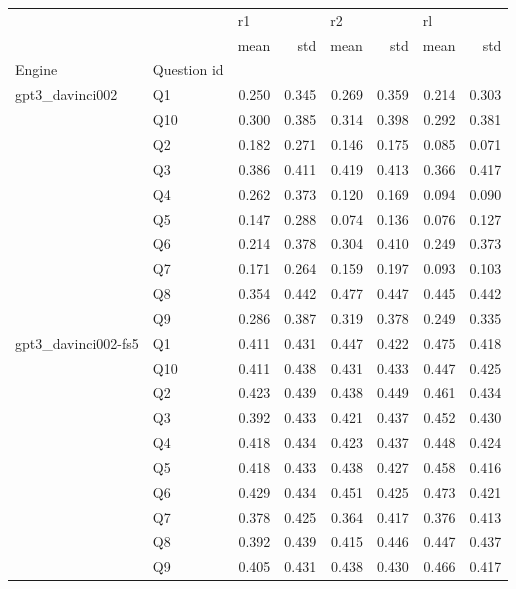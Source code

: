 \begin{tabular}{llrrrrrr}
\toprule
                &   & \multicolumn{2}{l}{r1} & \multicolumn{2}{l}{r2} & \multicolumn{2}{l}{rl} \\
                &   &  mean &   std &  mean &   std &  mean &   std \\
Engine & Question id &       &       &       &       &       &       \\
\midrule
gpt3\_davinci002 & Q1 & 0.250 & 0.345 & 0.269 & 0.359 & 0.214 & 0.303 \\
                & Q10 & 0.300 & 0.385 & 0.314 & 0.398 & 0.292 & 0.381 \\
                & Q2 & 0.182 & 0.271 & 0.146 & 0.175 & 0.085 & 0.071 \\
                & Q3 & 0.386 & 0.411 & 0.419 & 0.413 & 0.366 & 0.417 \\
                & Q4 & 0.262 & 0.373 & 0.120 & 0.169 & 0.094 & 0.090 \\
                & Q5 & 0.147 & 0.288 & 0.074 & 0.136 & 0.076 & 0.127 \\
                & Q6 & 0.214 & 0.378 & 0.304 & 0.410 & 0.249 & 0.373 \\
                & Q7 & 0.171 & 0.264 & 0.159 & 0.197 & 0.093 & 0.103 \\
                & Q8 & 0.354 & 0.442 & 0.477 & 0.447 & 0.445 & 0.442 \\
                & Q9 & 0.286 & 0.387 & 0.319 & 0.378 & 0.249 & 0.335 \\
gpt3\_davinci002-fs5 & Q1 & 0.411 & 0.431 & 0.447 & 0.422 & 0.475 & 0.418 \\
                & Q10 & 0.411 & 0.438 & 0.431 & 0.433 & 0.447 & 0.425 \\
                & Q2 & 0.423 & 0.439 & 0.438 & 0.449 & 0.461 & 0.434 \\
                & Q3 & 0.392 & 0.433 & 0.421 & 0.437 & 0.452 & 0.430 \\
                & Q4 & 0.418 & 0.434 & 0.423 & 0.437 & 0.448 & 0.424 \\
                & Q5 & 0.418 & 0.433 & 0.438 & 0.427 & 0.458 & 0.416 \\
                & Q6 & 0.429 & 0.434 & 0.451 & 0.425 & 0.473 & 0.421 \\
                & Q7 & 0.378 & 0.425 & 0.364 & 0.417 & 0.376 & 0.413 \\
                & Q8 & 0.392 & 0.439 & 0.415 & 0.446 & 0.447 & 0.437 \\
                & Q9 & 0.405 & 0.431 & 0.438 & 0.430 & 0.466 & 0.417 \\

\end{tabular}
